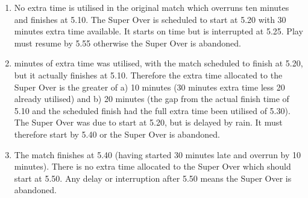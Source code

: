 \documentclass[12pt]{article}
\begin{document}
\vspace{\baselineskip}
\begin{enumerate}
	\item {\fontsize{9pt}{10.8pt}\selectfont No extra time is utilised in the original match which overruns ten minutes and finishes at 5.10. The Super Over is scheduled to start at 5.20 with 30 minutes extra time available. It starts on time but is interrupted at 5.25. Play must resume by 5.55 otherwise the Super Over is abandoned.\par}\par


\vspace{\baselineskip}
	\item {\fontsize{9pt}{10.8pt} minutes of extra time was utilised, with the match scheduled to finish at 5.20, but it actually finishes at 5.10. Therefore the extra time allocated to the Super Over is the greater of a) 10 minutes (30 minutes extra time less 20 already utilised) and b) 20 minutes (the gap from the actual finish time of 5.10 and the scheduled finish had the full extra time been utilised of 5.30). The Super Over was due to start at 5.20, but is delayed by rain. It must therefore start by 5.40 or the Super Over is abandoned.\par}\par


\vspace{\baselineskip}
	\item {\fontsize{9pt}{10.8pt}\selectfont The match finishes at 5.40 (having started 30 minutes late and overrun by 10 minutes). There is no extra time allocated to the Super Over which should start at 5.50. Any delay or interruption after 5.50 means the Super Over is abandoned.\par}
\end{enumerate}\par


\vspace{\baselineskip}

\vspace{\baselineskip}

\vspace{\baselineskip}

\vspace{\baselineskip}

\vspace{\baselineskip}

\vspace{\baselineskip}
\end{document}
